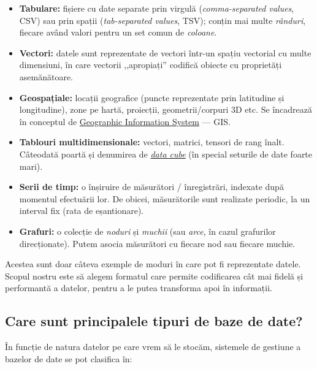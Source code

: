 \documentclass[a4paper, 12pt]{article}
\begin{document}
\begin{itemize}
    \item \textbf{Tabulare:} fișiere cu date separate prin virgulă (\textit{comma-separated values}, CSV) sau prin spații (\textit{tab-separated values}, TSV); conțin mai multe \emph{rânduri}, fiecare având valori pentru un set comun de \emph{coloane}.
    \item \textbf{Vectori:} datele sunt reprezentate de vectori într-un spațiu vectorial cu multe dimensiuni, în care vectorii ,,apropiați'' codifică obiecte cu proprietăți asemănătoare.
    \item \textbf{Geospațiale:} locații geografice (puncte reprezentate prin latitudine și longitudine), zone pe hartă, proiecții, geometrii/corpuri 3D etc. Se încadrează în conceptul de \href{https://en.wikipedia.org/wiki/Geographic_information_system}{Geographic Information System} --- GIS.
    \item \textbf{Tablouri multidimensionale:} vectori, matrici, tensori de rang înalt. Câteodată poartă și denumirea de \href{https://en.wikipedia.org/wiki/Data_cube}{\textit{data cube}} (în special seturile de date foarte mari).
    \item \textbf{Serii de timp:} o înșiruire de măsurători / înregistrări, indexate după momentul efectuării lor. De obicei, măsurătorile sunt realizate periodic, la un interval fix (rata de eșantionare).
    \item \textbf{Grafuri:} o colecție de \emph{noduri} și \emph{muchii} (sau \emph{arce}, în cazul grafurilor direcționate). Putem asocia măsurători cu fiecare nod sau fiecare muchie.
\end{itemize}

Acestea sunt doar câteva exemple de moduri în care pot fi reprezentate datele. Scopul nostru este să alegem formatul care permite codificarea cât mai fidelă și performantă a datelor, pentru a le putea transforma apoi în informații.

\subsection*{Care sunt principalele tipuri de baze de date?}

În funcție de natura datelor pe care vrem să le stocăm, sistemele de gestiune a bazelor de date se pot clasifica în:
\end{document}
